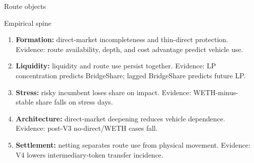 \documentclass[aspectratio=169,11pt]{beamer}
\newcommand{\key}[1]{\textcolor{DVCBlue}{\textbf{#1}}}
\begin{document}
\begin{frame}{Route objects}
\centering
{}
\end{frame}

\begin{frame}{Empirical spine}
\begin{enumerate}
  \item \key{Formation:} direct-market incompleteness and thin-direct protection.\newline
  Evidence: route availability, depth, and cost advantage predict vehicle use.
  \item \key{Liquidity:} liquidity and route use persist together.\newline
  Evidence: LP concentration predicts BridgeShare; lagged BridgeShare predicts future LP.
  \item \key{Stress:} risky incumbent loses share on impact.\newline
  Evidence: WETH-minus-stable share falls on stress days.
  \item \key{Architecture:} direct-market deepening reduces vehicle dependence.\newline
  Evidence: post-V3 no-direct/WETH cases fall.
  \item \key{Settlement:} netting separates route use from physical movement.\newline
  Evidence: V4 lowers intermediary-token transfer incidence.
\end{enumerate}
\end{frame}
\end{document}
